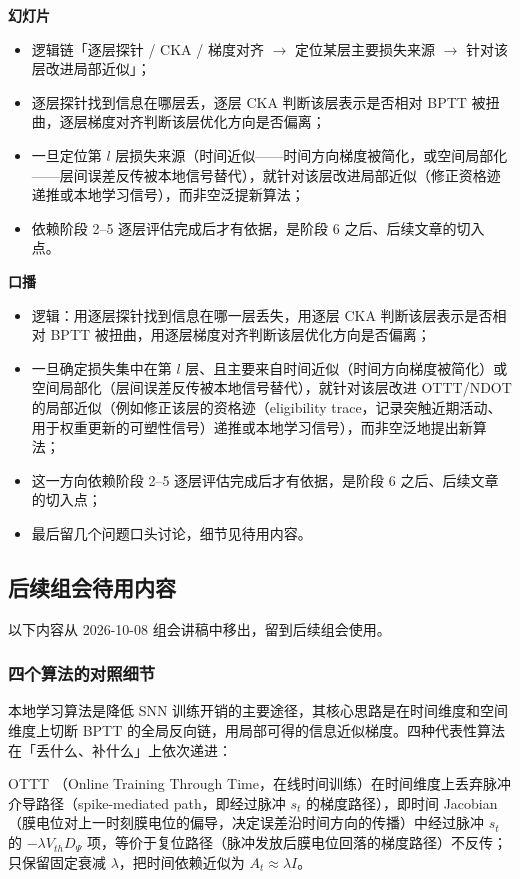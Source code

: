 \documentclass[journal,12pt,onecolumn]{IEEEtran}
\begin{document}
\textbf{幻灯片}
\begin{itemize}[leftmargin=1.5em,itemsep=0pt]
\item 逻辑链「逐层探针 / CKA / 梯度对齐 $\to$ 定位某层主要损失来源 $\to$ 针对该层改进局部近似」；
\item 逐层探针找到信息在哪层丢，逐层 CKA 判断该层表示是否相对 BPTT 被扭曲，逐层梯度对齐判断该层优化方向是否偏离；
\item 一旦定位第 $l$ 层损失来源（时间近似——时间方向梯度被简化，或空间局部化——层间误差反传被本地信号替代），就针对该层改进局部近似（修正资格迹递推或本地学习信号），而非空泛提新算法；
\item 依赖阶段 2--5 逐层评估完成后才有依据，是阶段 6 之后、后续文章的切入点。
\end{itemize}

\textbf{口播}
\begin{itemize}[leftmargin=1.5em,itemsep=0pt]
\item 逻辑：用逐层探针找到信息在哪一层丢失，用逐层 CKA 判断该层表示是否相对 BPTT 被扭曲，用逐层梯度对齐判断该层优化方向是否偏离；
\item 一旦确定损失集中在第 $l$ 层、且主要来自时间近似（时间方向梯度被简化）或空间局部化（层间误差反传被本地信号替代），就针对该层改进 OTTT/NDOT 的局部近似（例如修正该层的资格迹（eligibility trace，记录突触近期活动、用于权重更新的可塑性信号）递推或本地学习信号），而非空泛地提出新算法；
\item 这一方向依赖阶段 2--5 逐层评估完成后才有依据，是阶段 6 之后、后续文章的切入点；
\item 最后留几个问题口头讨论，细节见待用内容。
\end{itemize}

\subsection{后续组会待用内容}

以下内容从 2026-10-08 组会讲稿中移出，留到后续组会使用。

\subsubsection{四个算法的对照细节}

本地学习算法是降低 SNN 训练开销的主要途径，其核心思路是在时间维度和空间维度上切断 BPTT 的全局反向链，用局部可得的信息近似梯度。四种代表性算法在「丢什么、补什么」上依次递进：

OTTT \cite{xiao_online_2022}（Online Training Through Time，在线时间训练）在时间维度上丢弃脉冲介导路径（spike-mediated path，即经过脉冲 $s_t$ 的梯度路径），即时间 Jacobian（膜电位对上一时刻膜电位的偏导，决定误差沿时间方向的传播）中经过脉冲 $s_t$ 的 $-\lambda V_{th}D_\Psi$ 项，等价于复位路径（脉冲发放后膜电位回落的梯度路径）不反传；只保留固定衰减 $\lambda$，把时间依赖近似为 $A_t\approx\lambda I$。
\end{document}
